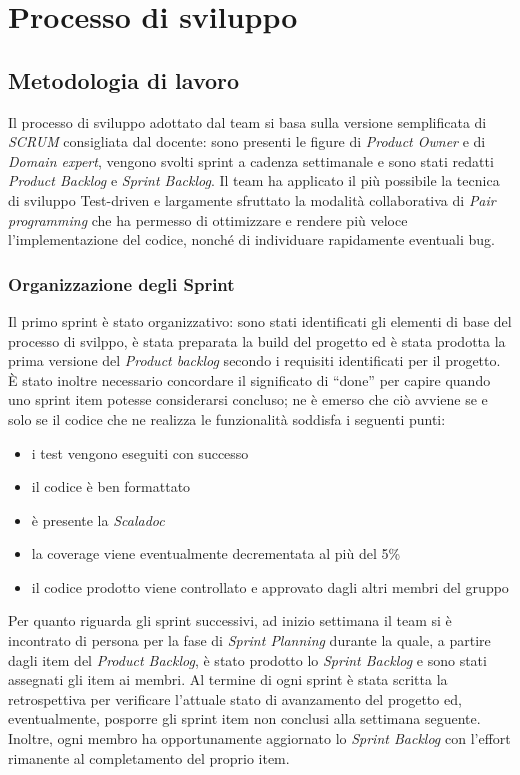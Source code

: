 \chapter{Processo di sviluppo}\label{ch:processo-di-sviluppo}
\section{Metodologia di lavoro}\label{sec:metodologia-di-lavoro}
Il processo di sviluppo adottato dal team si basa sulla versione semplificata di \textit{SCRUM} consigliata dal docente:
sono presenti le figure di \textit{Product Owner} e di \textit{Domain expert}, vengono svolti sprint a cadenza settimanale e sono stati redatti
\textit{Product Backlog} e \textit{Sprint Backlog}.
Il team ha applicato il più possibile la tecnica di sviluppo Test-driven e largamente sfruttato la modalità collaborativa di \textit{Pair programming} che ha
permesso di ottimizzare e rendere più veloce l'implementazione del codice, nonché di individuare rapidamente eventuali bug.

\subsection{Organizzazione degli Sprint}\label{subsec:organizzazione-sprint}
Il primo sprint è stato organizzativo: sono stati identificati gli elementi di base del processo di svilppo, è stata preparata la build del progetto ed è stata prodotta la prima versione del \textit{Product backlog}
secondo i requisiti identificati per il progetto.
È stato inoltre necessario concordare il significato di ``done'' per capire quando uno sprint item potesse considerarsi concluso;
ne è emerso che ciò avviene se e solo se il codice che ne realizza le funzionalità soddisfa i seguenti punti:
\begin{itemize}
    \item i test vengono eseguiti con successo
    \item il codice è ben formattato
    \item è presente la \textit{Scaladoc}
    \item la coverage viene eventualmente decrementata al più del 5\%
    \item il codice prodotto viene controllato e approvato dagli altri membri del gruppo
\end{itemize}
Per quanto riguarda gli sprint successivi, ad inizio settimana il team si è incontrato di persona per la fase di \textit{Sprint Planning} durante la quale, a partire dagli item del \textit{Product Backlog}, è stato prodotto
lo \textit{Sprint Backlog} e sono stati assegnati gli item ai membri.
Al termine di ogni sprint è stata scritta la retrospettiva per verificare l'attuale stato di avanzamento del progetto ed, eventualmente,
posporre gli sprint item non conclusi alla settimana seguente.
Inoltre, ogni membro ha opportunamente aggiornato lo \textit{Sprint Backlog} con l'effort rimanente al completamento del proprio item.

